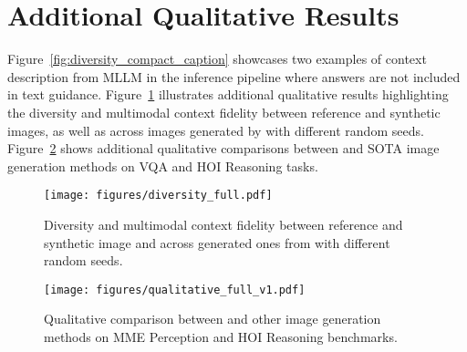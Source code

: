 \section{Additional Qualitative Results}
\label{appendix:visuals}
Figure~\ref{fig:diversity_compact_caption} showcases two examples of context description from MLLM in the inference pipeline where answers are not included in text guidance. Figure~\ref{fig:diversity_full} illustrates additional qualitative results highlighting the diversity and multimodal context fidelity between reference and synthetic images, as well as across images generated by \method with different random seeds. Figure~\ref{fig:qualitative_full} shows additional qualitative comparisons between \method and SOTA image generation methods on VQA and HOI Reasoning tasks.
\begin{figure}[!h]
    \centering
    \texttt{[image: figures/diversity\_full.pdf]}
    \vspace{-5mm}
    \caption{Diversity and multimodal context fidelity between reference and synthetic image and across generated ones from \method with different random seeds.}
    \label{fig:diversity_full}
\end{figure}
\begin{figure}[!h]
    \centering
    \texttt{[image: figures/qualitative\_full\_v1.pdf]}
    \vspace{-5mm}
    \caption{Qualitative comparison between \method and other image generation methods on MME Perception and HOI Reasoning benchmarks.}
    \label{fig:qualitative_full}
\end{figure}